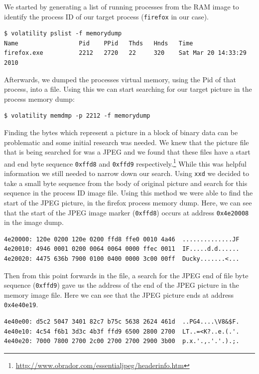\documentclass[a4paper,
    11pt,
    normalheadings,
    parindent,
    UKenglish,
    abstracton,
    ]{scrartcl}
\begin{document}
We started by generating a  list of running processes from the RAM image to identify the process ID of our target process (\texttt{firefox} in our case).

\begin{verbatim}
$ volatility pslist -f memorydump
Name                 Pid    PPid   Thds   Hnds   Time
firefox.exe          2212   2720   22     320    Sat Mar 20 14:33:29 2010
\end{verbatim}

Afterwards, we dumped the processes virtual memory, using the Pid of that process, into a file. Using this we can start searching for our target picture in the process memory dump:

\begin{verbatim}
$ volatility memdmp -p 2212 -f memorydump
\end{verbatim}

Finding the bytes which represent a picture in a block of binary data can be problematic and some initial research was needed.
We knew  that the picture file that is being searched for was a JPEG and we found that these files have a start and end byte sequence \texttt{0xffd8} and  \texttt{0xffd9} respectively.\footnote{\url{http://www.obrador.com/essentialjpeg/headerinfo.htm}}
While this was helpful information we still needed to narrow down our search.
Using \texttt{xxd} we decided to take a small byte sequence from the body of original picture and search for this sequence in the process ID image file.
Using this method we were able to find the start of the JPEG picture, in the firefox process memory dump.
Here, we  can see that the start of the JPEG image marker (\texttt{0xffd8}) occurs at address \texttt{0x4e20008} in the image dump.
\begin{verbatim}
4e20000: 120e 0200 120e 0200 ffd8 ffe0 0010 4a46  ..............JF
4e20010: 4946 0001 0200 0064 0064 0000 ffec 0011  IF.....d.d......
4e20020: 4475 636b 7900 0100 0400 0000 3c00 00ff  Ducky.......<...
\end{verbatim}

Then from this point forwards in the file, a search for the JPEG end of file byte sequence (\texttt{0xffd9}) gave us the address of the end of the JPEG picture in the memory image file.
Here we can see that the JPEG picture ends at address \texttt{0x4e40e19}.
\begin{verbatim}
4e40e00: d5c2 5047 3401 82c7 b75c 5638 2624 461d  ..PG4....\V8&$F.
4e40e10: 4c54 f6b1 3d3c 4b3f ffd9 6500 2800 2700  LT..=<K?..e.(.'.
4e40e20: 7000 7800 2700 2c00 2700 2700 2900 3b00  p.x.'.,.'.'.).;.
\end{verbatim}
\end{document}
